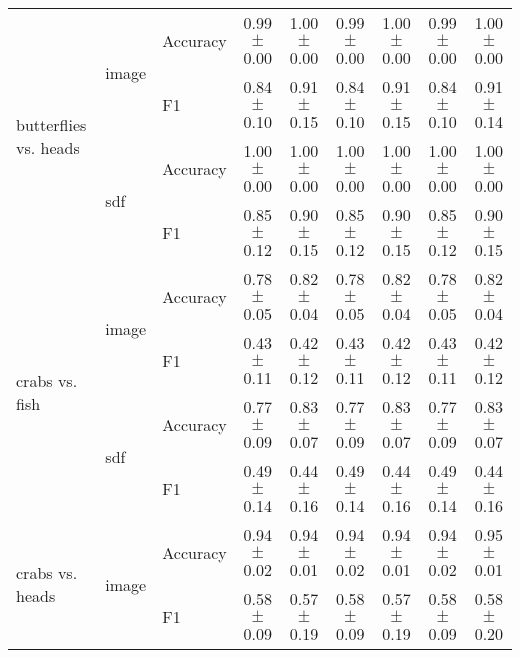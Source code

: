 \documentclass[anon,11pt]{9520} %
\begin{document}
\begin{table}
\begin{center}
\begin{tabular}{l|l|l|cc|cc|cc|}
\multirow{4}{*}{butterflies vs. heads}
& \multirow{2}{*}{image} & \multirow{1}{*}{Accuracy}& 0.99$\pm$0.00& 1.00$\pm$0.00& 0.99$\pm$0.00& 1.00$\pm$0.00& 0.99$\pm$0.00& 1.00$\pm$0.00\\ 
& & \multirow{1}{*}{F1}& 0.84$\pm$0.10& 0.91$\pm$0.15& 0.84$\pm$0.10& 0.91$\pm$0.15& 0.84$\pm$0.10& 0.91$\pm$0.14\\ \cline{2-9} 

& \multirow{2}{*}{sdf} & \multirow{1}{*}{Accuracy}& 1.00$\pm$0.00& 1.00$\pm$0.00& 1.00$\pm$0.00& 1.00$\pm$0.00& 1.00$\pm$0.00& 1.00$\pm$0.00\\ 
& & \multirow{1}{*}{F1}& 0.85$\pm$0.12& 0.90$\pm$0.15& 0.85$\pm$0.12& 0.90$\pm$0.15& 0.85$\pm$0.12& 0.90$\pm$0.15\\ \cline{2-9} 

\multirow{4}{*}{crabs vs. fish}
& \multirow{2}{*}{image} & \multirow{1}{*}{Accuracy}& 0.78$\pm$0.05& 0.82$\pm$0.04& 0.78$\pm$0.05& 0.82$\pm$0.04& 0.78$\pm$0.05& 0.82$\pm$0.04\\ 
& & \multirow{1}{*}{F1}& 0.43$\pm$0.11& 0.42$\pm$0.12& 0.43$\pm$0.11& 0.42$\pm$0.12& 0.43$\pm$0.11& 0.42$\pm$0.12\\ \cline{2-9} 

& \multirow{2}{*}{sdf} & \multirow{1}{*}{Accuracy}& 0.77$\pm$0.09& 0.83$\pm$0.07& 0.77$\pm$0.09& 0.83$\pm$0.07& 0.77$\pm$0.09& 0.83$\pm$0.07\\ 
& & \multirow{1}{*}{F1}& 0.49$\pm$0.14& 0.44$\pm$0.16& 0.49$\pm$0.14& 0.44$\pm$0.16& 0.49$\pm$0.14& 0.44$\pm$0.16\\ \cline{2-9} 

\multirow{4}{*}{crabs vs. heads}
& \multirow{2}{*}{image} & \multirow{1}{*}{Accuracy}& 0.94$\pm$0.02& 0.94$\pm$0.01& 0.94$\pm$0.02& 0.94$\pm$0.01& 0.94$\pm$0.02& 0.95$\pm$0.01\\ 
& & \multirow{1}{*}{F1}& 0.58$\pm$0.09& 0.57$\pm$0.19& 0.58$\pm$0.09& 0.57$\pm$0.19& 0.58$\pm$0.09& 0.58$\pm$0.20\\ \cline{2-9} 


\end{tabular}
\end{center}
\end{table}
\end{document}

